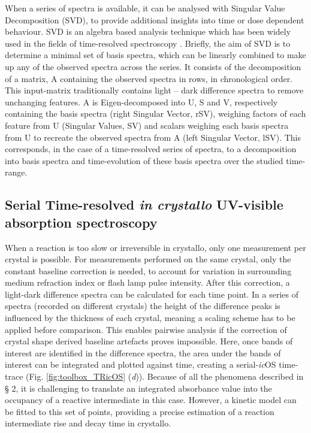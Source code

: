 When a series of spectra is available, it can be analysed with Singular Value Decomposition (SVD), to provide additional insights into time or dose dependent behaviour. SVD is an algebra based analysis technique which has been widely used in the fields of time-resolved spectroscopy \parencite{henryUseMatrixMethods1997,henrySingularValueDecomposition1992}. Briefly, the aim of SVD is to determine a minimal set of basis spectra, which can be linearly combined to make up any of the observed spectra across the series. It consists of the decomposition of a matrix, A containing the observed spectra in rows, in chronological order. This input-matrix traditionally contains light – dark difference spectra to remove unchanging features. A is Eigen-decomposed into U, S and V, respectively containing the basis spectra (right Singular Vector, rSV), weighing factors of each feature from U (Singular Values, SV) and scalars weighing each basis spectra from U to recreate the observed spectra from A (left Singular Vector, lSV). This corresponds, in the case of a time-resolved series of spectra, to a decomposition into basis spectra and time-evolution of these basis spectra over the studied time-range. 

\subsection{Serial Time-resolved \textit{in crystallo} UV-visible absorption spectroscopy}
When a reaction is too slow or irreversible in crystallo, only one measurement per crystal is possible. For measurements performed on the same crystal, only the constant baseline correction is needed, to account for variation in surrounding medium refraction index or flash lamp pulse intensity. After this correction, a light-dark difference spectra can be calculated for each time point. In a series of spectra (recorded on different crystals) the height of the difference peaks is influenced by the thickness of each crystal, meaning a scaling scheme has to be applied before comparison. This enables pairwise analysis if the correction of crystal shape derived baseline artefacts proves impossible. Here, once bands of interest are identified in the difference spectra, the area under the bands of interest can be integrated and plotted against time, creating a serial-\textit{ic}OS time-trace (Fig. \ref{fig:toolbox_TRicOS} (\textit{d})). Because of all the phenomena described in § 2, it is challenging to translate an integrated absorbance value into the occupancy of a reactive intermediate in this case. However, a kinetic model can be fitted to this set of points, providing a precise estimation of a reaction intermediate rise and decay time in crystallo.

